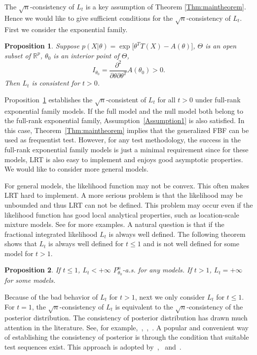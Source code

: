 \documentclass[11pt]{article}
\theoremstyle{plain}
\newtheorem{proposition}{\quad\quad Proposition}
\theoremstyle{definition}
\theoremstyle{remark}
\begin{document}
 The $\sqrt{n}$-consistency of $L_t$ is a key assumption of Theorem \ref{Thm:maintheorem}.
Hence we would like to give sufficient conditions for the $\sqrt{n}$-consistency of $L_t$.
 First we consider the exponential family.
\begin{proposition}\label{exponentialCon}
    Suppose $p(X|\theta)=\exp\big[\theta^T T(X)-A(\theta)\big]$, $\Theta$ is an open subset of $\mathbb{R}^p$, $\theta_0$ is an interior point of $\Theta$, 
    $$I_{\theta_0}=\frac{\partial^2}{\partial \theta \partial \theta^T} A(\theta_0)>0.$$
    Then $L_{t}$ is consistent for $t>0$.
\end{proposition}

Proposition~\ref{exponentialCon} establishes the $\sqrt{n}$-consistent of $L_t$ for all $t>0$ under full-rank exponential family models.
If the full model and the null model both belong to the full-rank exponential family, Assumption~\ref{Assumption1} is also satisfied.
In this case, Theorem~\ref{Thm:maintheorem} implies that the generalized FBF can be used as frequentist test.
However,
for any test methodology, the success in the full-rank exponential family models is just a minimal requirement 
since for these models, LRT is also easy to implement and enjoys good asymptotic properties.
We would like to consider more general models.


For general models, the likelihood function may not be convex.
This often makes LRT hard to implement.
A more serious problem is that the likelihood may be unbounded and thus LRT can not be defined.
This problem may occur even if the likelihood function has good local analytical properties, such as location-scale mixture models.  See \cite{Cam1990Maximum} for more examples.
A natural question is that if the fractional integrated likelihood $L_t$ is always well defined.
The following theorem shows that $L_t$ is always well defined for $t\leq 1$ and is not well defined for some model for $t>1$.
\begin{proposition}
    If $t\leq 1$, $L_t< +\infty$ $P_{\theta_0}^n$-a.s. for any models. If $t> 1$, $L_t = +\infty$ for some models.
    \label{exprop}
\end{proposition}



Because of the bad behavior of $L_t$ for $t>1$, next we only consider $L_t$ for $t\leq 1$.
 For $t=1$, the $\sqrt{n}$-consistency of $L_t$ is equivalent to the $\sqrt{n}$-consistency of the posterior distribution.
 The consistency of posterior distribution has drawn much attention in the literature.
 See, for example,~\cite{ghosal2000},~\cite{Shen2001Rates},~\cite{vaart2007convergence}.
A popular and convenient way of establishing the consistency of posterior is through the condition that suitable test sequences exist.
This approach is adopted by~\cite{ghosal2000},~\cite{vaart2007convergence} and~\cite{Kleijn2012The}.
\end{document}
